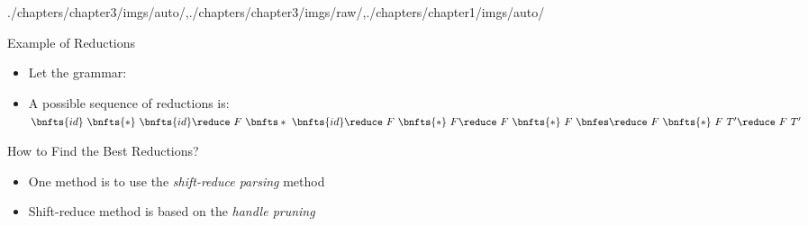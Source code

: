 \begin{graphicspathcontext}{{./chapters/chapter3/imgs/auto/},{./chapters/chapter3/imgs/raw/},{./chapters/chapter1/imgs/auto/}}
\begin{bibunit}[apalike]
\begin{frame}[t]{Example of Reductions}
	\vspace{-.5cm}
	\begin{small}
	\begin{itemize}
	\item Let the grammar:
	\item A possible sequence of reductions is: \\
		{$\bnfts{id}~\bnfts{*}~\bnfts{id} \reduce~F~\bnfts*~\bnfts{id} \reduce~F~\bnfts{*}~F \reduce~F~\bnfts{*}~F~\bnfes \reduce~F~\bnfts{*}~F~T' \reduce~F~T'$} \\
		\mbox{\only<2>{$\reduce~T	\reduce~T~\bnfes \reduce~T~E' \reduce~E$}}
	\end{itemize}
	\end{small}
	\vfill
	\begin{center}
	\end{center}
\end{frame}

\begin{frame}[background=8]{How to Find the Best Reductions?}
	\vspace{4em}
	\begin{itemize}
	\item One method is to use the \emph{shift-reduce parsing} method
	\vspace{2em}
	\item Shift-reduce method is based on the \emph{handle pruning}
	\end{itemize}
\end{frame}


\end{bibunit}
\end{graphicspathcontext}
